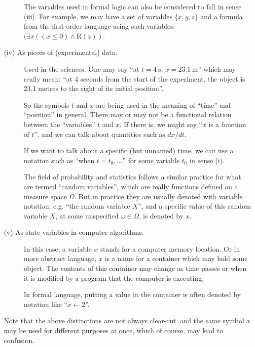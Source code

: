 \documentclass[12pt]{article}
\begin{document}
\begin{description}
The variables used in formal logic can also be considered to fall in sense (iii).
For example, we may have a set of variables $ \{ x, y, z \}$
and a formula from the first-order language using such variables: 
$( \exists x (( x \leq 0) \land \mathrm{R}(z) )$.


\item[(iv) As pieces of (experimental) data.]
Used in the sciences.  One may say ``at $t=4 \: \mathrm{s}$, $x=23.1 \: \mathrm{m}$''
which may really mean: ``at 4 seconds from the start of the experiment,
the object is 23.1 metres to the right of its initial position''.

So the symbols $t$ and $x$ are being used in the meaning
of ``time'' and ``position'' in general.  
There may or may not be a functional relation between
the ``variables'' $t$ and $x$.  If there is, we might say 
``$x$ is a function of $t$'', and we can talk about
quantities such as $dx/dt$.

If we want to talk about a specific (but unnamed) time,
we can use a notation such as ``when $t = t_0, \dotsc$''
for some variable $t_0$ in sense (i).

The field of probability and statistics follows a similar
practice for what are termed ``random variables'',
which are really functions defined on a measure space $\Omega$.
But in practice they are usually denoted with variable notation:
e.g. ``the random variable $X$'', and a specific value of this
random variable $X$, at some unspecified $\omega \in \Omega$, 
is denoted by $x$.

\item[(v) As state variables in computer algorithms.]
In this case, a variable $x$ stands for a computer memory location.
Or in more abstract language, $x$ is a name for a container
which may hold some object.
The contents of this container may change as time passes
or when it is modified by a program that the computer is executing.

In formal language, putting a value in the container
is often denoted by notation like ``$x \leftarrow 2$''.

\end{description}

Note that the above distinctions are not always clear-cut.
and the same symbol $x$ may be 
used for different purposes at once,
which of course, may lead to confusion.

\end{document}
